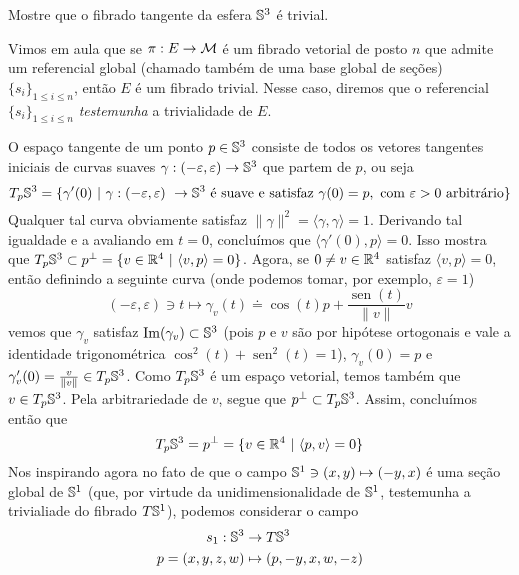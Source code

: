 \begin{Mybox}
Mostre que o fibrado tangente da esfera $\S^3$ é trivial.
\vspace{-.4cm}
\end{Mybox}
\vspace{-.5cm}
\begin{oobs}
Vimos em aula que se $\pi : E \to \mm$ é um fibrado vetorial de posto $n$ que admite um referencial global (chamado também de uma base global de seções) $\{s_i \}_{1 \leq i \leq n}$, então $E$ é um fibrado trivial. Nesse caso, diremos que o referencial $\{s_i \}_{1 \leq i \leq n}$ \textit{testemunha} a trivialidade de $E$.
\end{oobs}
\begin{dem}
O espaço tangente de um ponto $p \in \S^3$ consiste de todos os vetores tangentes iniciais de curvas suaves $\gamma: (-\varepsilon, \varepsilon) \to \S^3$ que partem de $p$, ou seja
\[
T_p \S^3 = \{\gamma'(0) \ \vert \ \gamma: (-\varepsilon, \varepsilon) \  \to \S^3 \text{ é suave e satisfaz } \gamma(0) = p, \text{ com } \varepsilon > 0 \text{ arbitrário}\}
\]
Qualquer tal curva obviamente satisfaz $\| \gamma \|^2 = \langle \gamma, \gamma \rangle = 1$. Derivando tal igualdade e a avaliando em $t = 0$, concluímos que $\langle \gamma'(0), p \rangle = 0$. Isso mostra que $T_p \S^3 \subset p^{\perp} = \{v \in \R^4 \ \vert \ \langle v, p \rangle = 0 \}$. Agora, se $0 \neq v \in \R^4$ satisfaz $\langle v, p \rangle = 0$, então definindo a seguinte curva (onde podemos tomar, por exemplo, $\varepsilon = 1$)
$$(-\varepsilon, \varepsilon) \ni t \mapsto \gamma_v(t) \doteq \cos(t) p + \frac{\operatorname{sen}(t)}{\| v \|} v$$
vemos que $\gamma_v$ satisfaz $\operatorname{Im}(\gamma_v) \subset \S^3$ (pois $p$ e $v$ são por hipótese ortogonais e vale a identidade trigonométrica $\cos^2(t) + \operatorname{sen}^2(t) = 1$), $\gamma_v(0) = p$ e $\gamma_v'(0) = \frac{v}{\|v\|} \in  T_{p} \S^3$. Como $T_p \S^3$ é um espaço vetorial, temos também que $v \in T_{p} \S^3$. Pela arbitrariedade de $v$, segue que $p^{\perp} \subset T_p \S^3$. Assim, concluímos então que
\[
T_p \S^3 = p^{\perp} = \{v \in \R^4 \ \vert \ \langle p, v \rangle = 0 \}
\]
Nos inspirando agora no fato de que o campo $\S^1 \ni (x, y) \mapsto (-y, x)$ é uma seção global de $\S^1$ (que, por virtude da unidimensionalidade de $\S^1$, testemunha a trivialiade do fibrado $T \S^1$), podemos considerar o campo
\[\begin{aligned}
s_1 : \S^3 &\to T \S^3 \\
p = (x, y, z, w) &\mapsto (p, -y, x, w, -z)

\end{aligned}\]
\end{dem}
